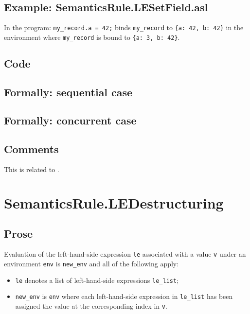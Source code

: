 \documentclass{book}
\begin{document}
    \subsection{Example: SemanticsRule.LESetField.asl}
    In the program:
    \texttt{my\_record.a = 42;} binds \texttt{my\_record} to \texttt{\{a: 42, b: 42\}} in the environment where \texttt{my\_record} is bound to \texttt{\{a: 3, b: 42\}}.

  \subsection{Code}

\begin{emptyformal}
  \subsection{Formally: sequential case}

  \subsection{Formally: concurrent case}
\end{emptyformal}

\subsection{Comments}
  This is related to .


\section{SemanticsRule.LEDestructuring \label{sec:SemanticsRule.LEDestructuring}}

    \subsection{Prose}
    Evaluation of the left-hand-side expression \texttt{le} associated with a
value \texttt{v} under an environment \texttt{env} is \texttt{new\_env} and all
of the following apply:
    \begin{itemize}
    \item \texttt{le} denotes a list of left-hand-side expressions \texttt{le\_list};
    \item \texttt{new\_env} is \texttt{env} where each left-hand-side expression in \texttt{le\_list} has
      been assigned the value at the corresponding index in \texttt{v}.
    \end{itemize}
\end{document}
